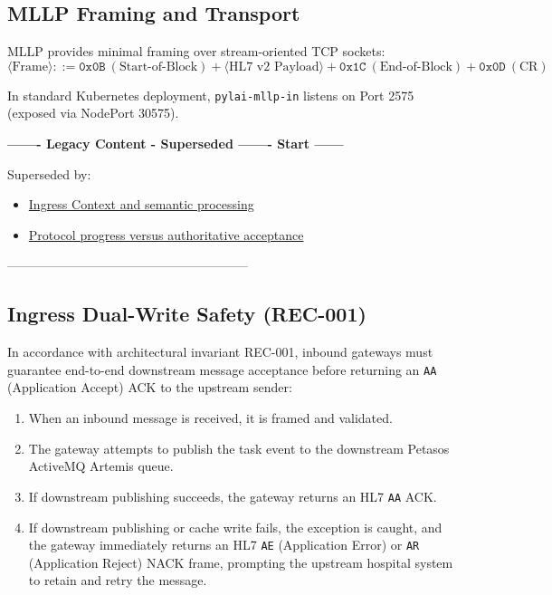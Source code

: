 \subsection{MLLP Framing and Transport}
MLLP provides minimal framing over stream-oriented TCP sockets:
\begin{equation}
\langle\text{Frame}\rangle ::= \texttt{0x0B}\ (\text{Start-of-Block}) + \langle\text{HL7 v2 Payload}\rangle + \texttt{0x1C}\ (\text{End-of-Block}) + \texttt{0x0D}\ (\text{CR})
\end{equation}

In standard Kubernetes deployment, \texttt{pylai-mllp-in} listens on Port 2575 (exposed via NodePort 30575).

\par\noindent\textbf{------- Legacy Content - Superseded ------- Start ------}
\par\noindent Superseded by:
\begin{itemize}
  \item \href{../../markdown/05-information-systems-architecture/pylai-external-interoperability.md\#pylai-pathway-ingress}{Ingress Context and semantic processing}
  \item \href{../../markdown/05-information-systems-architecture/pylai-external-interoperability.md\#acceptance-and-acknowledgement}{Protocol progress versus authoritative acceptance}
\end{itemize}
\noindent ---------------------------------------------------------

\subsection{Ingress Dual-Write Safety (REC-001)}
In accordance with architectural invariant REC-001, inbound gateways must guarantee end-to-end downstream message acceptance before returning an \texttt{AA} (Application Accept) ACK to the upstream sender:
\begin{enumerate}
    \item When an inbound message is received, it is framed and validated.
    \item The gateway attempts to publish the task event to the downstream Petasos ActiveMQ Artemis queue.
    \item If downstream publishing succeeds, the gateway returns an HL7 \texttt{AA} ACK.
    \item If downstream publishing or cache write fails, the exception is caught, and the gateway immediately returns an HL7 \texttt{AE} (Application Error) or \texttt{AR} (Application Reject) NACK frame, prompting the upstream hospital system to retain and retry the message.
\end{enumerate}


